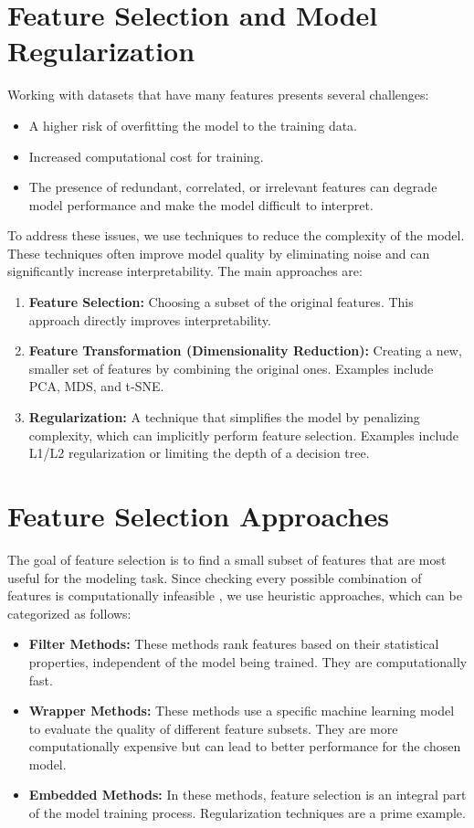 \documentclass{article}
\begin{document}
\begin{multicols}{2}
	\section{Feature Selection and Model Regularization}
	Working with datasets that have many features presents several challenges:
	\begin{itemize}
		\item A higher risk of overfitting the model to the training data.
		\item Increased computational cost for training.
		\item The presence of redundant, correlated, or irrelevant features can degrade model performance and make the model difficult to interpret.
	\end{itemize}

	To address these issues, we use techniques to reduce the complexity of the model. These techniques often improve model quality by eliminating noise and can significantly increase interpretability. The main approaches are:
	\begin{enumerate}
		\item \textbf{Feature Selection:} Choosing a subset of the original features. This approach directly improves interpretability.
		\item \textbf{Feature Transformation (Dimensionality Reduction):} Creating a new, smaller set of features by combining the original ones. Examples include PCA, MDS, and t-SNE.
		\item \textbf{Regularization:} A technique that simplifies the model by penalizing complexity, which can implicitly perform feature selection. Examples include L1/L2 regularization or limiting the depth of a decision tree.
	\end{enumerate}

	\section{Feature Selection Approaches}
	The goal of feature selection is to find a small subset of features that are most useful for the modeling task. Since checking every possible combination of features is computationally infeasible , we use heuristic approaches, which can be categorized as follows:
	\begin{itemize}
		\item \textbf{Filter Methods:} These methods rank features based on their statistical properties, independent of the model being trained. They are computationally fast.
		\item \textbf{Wrapper Methods:} These methods use a specific machine learning model to evaluate the quality of different feature subsets. They are more computationally expensive but can lead to better performance for the chosen model.
		\item \textbf{Embedded Methods:} In these methods, feature selection is an integral part of the model training process. Regularization techniques are a prime example.
	\end{itemize}


\end{multicols}
\end{document}
